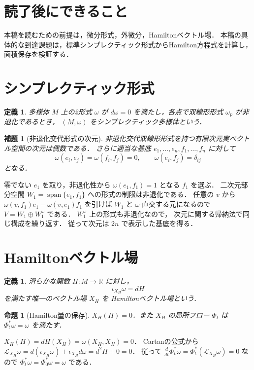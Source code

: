 \documentclass[a5paper,10pt,onecolumn]{jsarticle}
\makeatletter
\theoremstyle{mathnotetheorem}
\newtheorem{definition}[theorem]{定義}
\newtheorem{lemma}[theorem]{補題}
\newtheorem{proposition}[theorem]{命題}
\renewcommand{\proofname}{証明}
\renewenvironment{proof}[1][\proofname]{%
  \par\pushQED{\qed}\normalfont\topsep4\p@\@plus2\p@\relax
  \trivlist\item[\hskip\labelsep\bfseries #1]\ignorespaces
}{\popQED\endtrivlist\@endpefalse}
\makeatother
\begin{document}
\section*{読了後にできること}
本稿を読むための前提は，微分形式，外微分，Hamiltonベクトル場．
本稿の具体的な到達課題は，標準シンプレクティック形式からHamilton方程式を計算し，面積保存を検証する．


\section{シンプレクティック形式}
\begin{definition}
多様体 $M$ 上の2形式 $\omega$ が
$d\omega=0$ を満たし，各点で双線形形式
$\omega_p$ が非退化であるとき，
$(M,\omega)$ をシンプレクティック多様体という．
\end{definition}
\begin{lemma}[非退化交代形式の次元]\label{lem:even}
非退化交代双線形形式を持つ有限次元実ベクトル空間の次元は偶数である．
さらに適当な基底 $e_1,\dots,e_n,f_1,\dots,f_n$ に対して
\[
 \omega(e_i,e_j)=\omega(f_i,f_j)=0,\qquad
 \omega(e_i,f_j)=\delta_{ij}
\]
となる．
\end{lemma}
\begin{proof}
零でない $e_1$ を取り，非退化性から
$\omega(e_1,f_1)=1$ となる $f_1$ を選ぶ．
二次元部分空間 $W_1=\operatorname{span}\{e_1,f_1\}$
への形式の制限は非退化である．
任意の $v$ から
$\omega(v,f_1)e_1-\omega(v,e_1)f_1$ を引けば
$W_1$ と $\omega$-直交する元になるので
$V=W_1\oplus W_1^\omega$ である．
$W_1^\omega$ 上の形式も非退化なので，
次元に関する帰納法で同じ構成を繰り返す．
従って次元は $2n$ で表示した基底を得る．
\end{proof}
\section{Hamiltonベクトル場}
\begin{definition}
滑らかな関数 $H:M\to\mathbb R$ に対し，
\[
 \iota_{X_H}\omega=dH
\]
を満たす唯一のベクトル場 $X_H$ を
Hamiltonベクトル場という．
\end{definition}
\begin{proposition}[Hamilton量の保存]
$X_H(H)=0$．また $X_H$ の局所フロー $\Phi_t$ は
$\Phi_t^*\omega=\omega$ を満たす．
\end{proposition}
\begin{proof}
$X_H(H)=dH(X_H)=\omega(X_H,X_H)=0$．
Cartanの公式から
$\mathcal L_{X_H}\omega
 =d(\iota_{X_H}\omega)+\iota_{X_H}d\omega
 =d^2H+0=0$．
従って
$\frac d{dt}\Phi_t^*\omega
 =\Phi_t^*(\mathcal L_{X_H}\omega)=0$ なので
$\Phi_t^*\omega=\Phi_0^*\omega=\omega$ である．
\end{proof}
\end{document}
